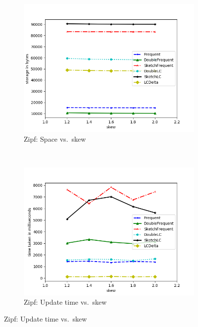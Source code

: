 \documentclass[sigconf,review=true,anonymous=true,screen]{acmart}
\begin{document}
\begin{figure}
\centering
\begin{subfigure}[b]{0.5\textwidth}
\includegraphics[width=\textwidth]{../Plots/storage_skew.png}
\caption{Zipf: Space vs.~skew}
\end{subfigure}
~
\begin{subfigure}[b]{0.5\textwidth}
\includegraphics[width=\textwidth]{../Plots/time_skew.png}
\caption{Zipf: Update time vs.~skew}
\end{subfigure}


\end{figure}
\end{document}
